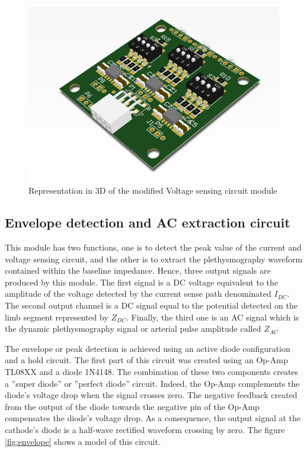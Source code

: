 \begin{figure}[!htpb]
	\centering
	\includegraphics[width=7.5 cm,keepaspectratio]{figure_Vsense}
	\caption{Representation in 3D of the modified Voltage sensing circuit module}
	\label{fig:voltage sense}
\end{figure}



%

\subsection{Envelope detection and AC extraction circuit}
This module has two functions, one is to detect the peak value of the current and voltage sensing circuit, and the other is to extract the plethysmography waveform contained within the baseline impedance. Hence, three output signals are produced by this module. The first signal is a DC voltage equivalent to the amplitude of the voltage detected by the current sense path denominated $I_{DC}$. The second output channel is a DC signal equal to the potential detected on the limb segment represented by $Z_{DC}$. Finally, the third one is an AC signal which is the dynamic plethysmography signal or arterial pulse amplitude called $Z_{AC}$

The envelope or peak detection is achieved using an active diode configuration and a hold circuit. The first part of this circuit was created using an Op-Amp TL08XX\cite{ti:TL08xx} and a diode 1N4148. The combination of these two components creates a ''super diode'' or ''perfect diode'' circuit. Indeed, the Op-Amp complements the diode's voltage drop when the signal crosses zero. The negative feedback created from the output of the diode towards the negative pin of the Op-Amp compensates the diode's voltage drop. As a consequence, the output signal at the cathode's diode is a half-wave rectified waveform crossing by zero. The figure \ref{fig:envelope} shows a model of this circuit. 

